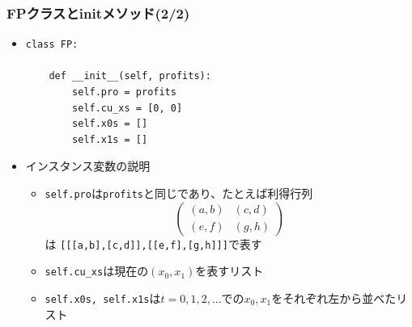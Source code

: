 \documentclass[dvipdfmx,fleqn]{beamer}
\begin{document}
\begin{frame}[fragile]%
\frametitle{FPクラスとinitメソッド(2/2)}
\begin{itemize}\setlength{\parskip}{0.5em}
\item

\footnotesize
\begin{verbatim}
class FP:

    def __init__(self, profits):
        self.pro = profits
        self.cu_xs = [0, 0]
        self.x0s = []
        self.x1s = []
 \end{verbatim}\pause
\normalsize
\item
インスタンス変数の説明\pause
\begin{itemize}\setlength{\parskip}{0.5em}

\item
\verb|self.pro|は\verb|profits|と同じであり、たとえば利得行列
\footnotesize
\begin{equation*}
\begin{pmatrix}
(a,b) & (c,d)\\
(e,f) & (g,h)
\end{pmatrix}
\end{equation*}
\normalsize
は
\verb|[[[a,b],[c,d]],[[e,f],[g,h]]]|で表す
\pause
\item
\verb|self.cu_xs|は現在の$(x_0,x_1)$を表すリスト\pause
\item
\verb|self.x0s, self.x1s|は$t=0,1,2,\dots$での$x_0,x_1$をそれぞれ左から並べたリスト

\end{itemize}

\end{itemize}
\end{frame}
\end{document}

